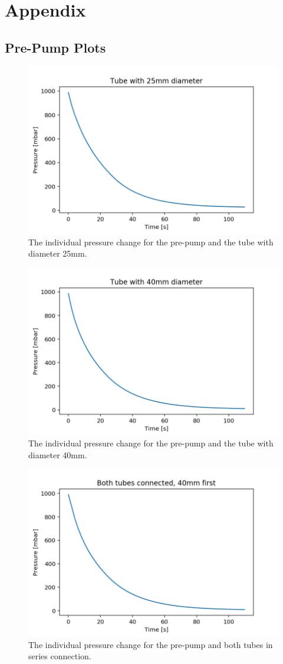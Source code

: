 \documentclass[]{article}
\begin{document}
\newpage

\section{Appendix}
\subsection{Pre-Pump Plots}
\label{Pre-Pump Plots}

\begin{figure}[!h]
\centering\includegraphics[width=.5\textwidth]{Plots/25mm.png}
\caption{The individual pressure change for the pre-pump and the tube with diameter 25mm.}
\label{fig::25mm}
\end{figure}

\begin{figure}[!h]
\centering\includegraphics[width=.5\textwidth]{Plots/40mm.png}
\caption{The individual pressure change for the pre-pump and the tube with diameter 40mm.}
\label{fig::40mm}
\end{figure}

\begin{figure}[!h]
\centering\includegraphics[width=.5\textwidth]{Plots/BothTubes.png}
\caption{The individual pressure change for the pre-pump and both tubes in series connection.}
\label{fig::BothTubes}
\end{figure}
\end{document}
